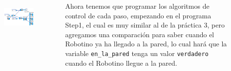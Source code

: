 \begin{frame}
	\begin{columns}
		\begin{figure}
			\begin{center}
				\includegraphics[width=0.95\textwidth]{images/00-control-multiple/01.png}
				\label{fig:multiple-01}
			\end{center}
		\end{figure}

		Ahora tenemos que programar los algoritmos de control de cada paso, empezando en el programa Step1, el cual es muy similar al de la práctica 3, pero agregamos una comparación para saber cuando el Robotino ya ha llegado a la pared, lo cual hará que la variable \texttt{en\_la\_pared} tenga un valor \texttt{verdadero} cuando el Robotino llegue a la pared.
	\end{columns}
\end{frame}

